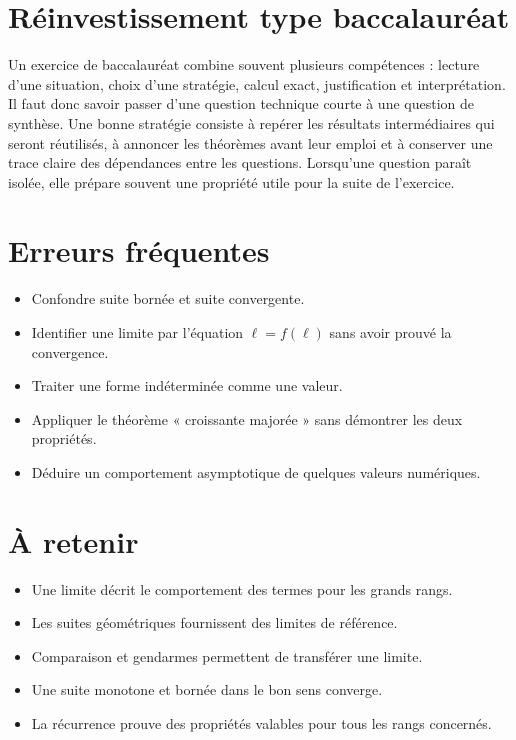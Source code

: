 \section{Réinvestissement type baccalauréat}
Un exercice de baccalauréat combine souvent plusieurs compétences : lecture d'une situation, choix d'une stratégie, calcul exact, justification et interprétation. Il faut donc savoir passer d'une question technique courte à une question de synthèse. Une bonne stratégie consiste à repérer les résultats intermédiaires qui seront réutilisés, à annoncer les théorèmes avant leur emploi et à conserver une trace claire des dépendances entre les questions. Lorsqu'une question paraît isolée, elle prépare souvent une propriété utile pour la suite de l'exercice.

\section{Erreurs fréquentes}
\begin{itemize}
\item Confondre suite bornée et suite convergente.
\item Identifier une limite par l’équation $\ell=f(\ell)$ sans avoir prouvé la convergence.
\item Traiter une forme indéterminée comme une valeur.
\item Appliquer le théorème « croissante majorée » sans démontrer les deux propriétés.
\item Déduire un comportement asymptotique de quelques valeurs numériques.
\end{itemize}

\section{À retenir}
\begin{aretenir}
\begin{itemize}
\item Une limite décrit le comportement des termes pour les grands rangs.
\item Les suites géométriques fournissent des limites de référence.
\item Comparaison et gendarmes permettent de transférer une limite.
\item Une suite monotone et bornée dans le bon sens converge.
\item La récurrence prouve des propriétés valables pour tous les rangs concernés.
\end{itemize}
\end{aretenir}
